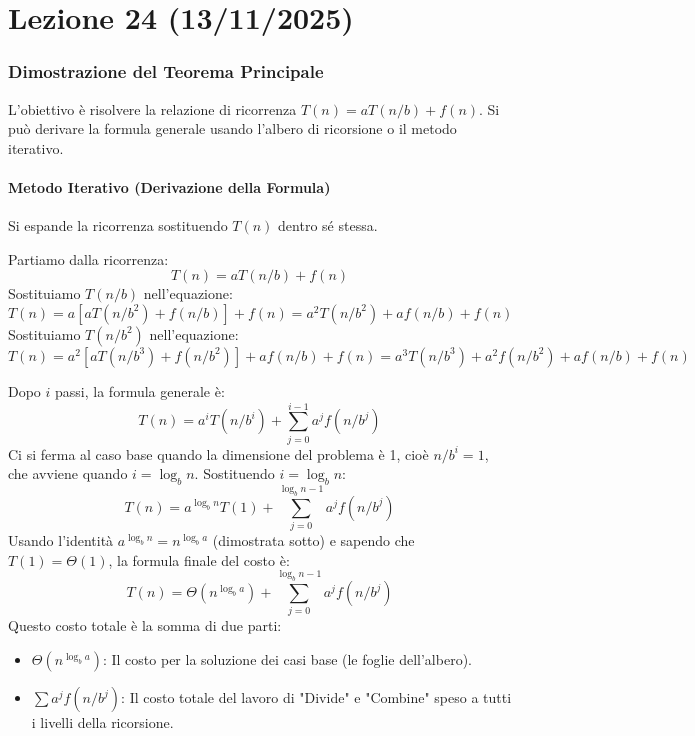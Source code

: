 
\part{Lezione 24 (13/11/2025)}

\section{Dimostrazione del Teorema Principale}
L'obiettivo è risolvere la relazione di ricorrenza $T(n) = aT(n/b) + f(n)$. Si può derivare la formula generale usando l'albero di ricorsione o il metodo iterativo.

\subsection{Metodo Iterativo (Derivazione della Formula)}
Si espande la ricorrenza sostituendo $T(n)$ dentro sé stessa.

\begin{definition}
Partiamo dalla ricorrenza:
\[ T(n) = aT(n/b) + f(n) \]
Sostituiamo $T(n/b)$ nell'equazione:
\[ T(n) = a \left[ aT(n/b^2) + f(n/b) \right] + f(n) = a^2 T(n/b^2) + af(n/b) + f(n) \]
Sostituiamo $T(n/b^2)$ nell'equazione:
\[ T(n) = a^2 \left[ aT(n/b^3) + f(n/b^2) \right] + af(n/b) + f(n) = a^3 T(n/b^3) + a^2 f(n/b^2) + af(n/b) + f(n) \]

Dopo $i$ passi, la formula generale è:
\[ T(n) = a^i T(n/b^i) + \sum_{j=0}^{i-1} a^j f(n/b^j) \]
Ci si ferma al caso base quando la dimensione del problema è 1, cioè $n/b^i = 1$, che avviene quando $i = \log_b n$. Sostituendo $i = \log_b n$:
\[ T(n) = a^{\log_b n} T(1) + \sum_{j=0}^{\log_b n - 1} a^j f(n/b^j) \]
Usando l'identità $a^{\log_b n} = n^{\log_b a}$ (dimostrata sotto) e sapendo che $T(1) = \Theta(1)$, la formula finale del costo è:
\[ T(n) = \Theta(n^{\log_b a}) + \sum_{j=0}^{\log_b n - 1} a^j f(n/b^j) \]
Questo costo totale è la somma di due parti:
\begin{itemize}
    \item \textbf{$\Theta(n^{\log_b a})$}: Il costo per la soluzione dei casi base (le foglie dell'albero).
    \item \textbf{$\sum a^j f(n/b^j)$}: Il costo totale del lavoro di "Divide" e "Combine" speso a tutti i livelli della ricorsione.
\end{itemize}
\end{definition}

